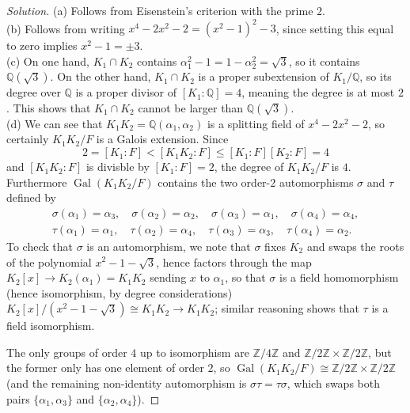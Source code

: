 \documentclass[10pt]{article}
\providecommand{\Gal}{\operatorname{Gal}}
\providecommand{\QQ}{\mathbb Q}
\providecommand{\ZZ}{\mathbb Z}
\newenvironment{soln}{\begin{proof}[Solution]}{\end{proof}}
\begin{document}
\begin{soln}
    (a) Follows from Eisenstein's criterion with the prime $2$.
    \\

    (b) Follows from writing
    $x^4 - 2x^2 - 2 = (x^2 - 1)^2 - 3$,
    since setting this equal to zero implies
    $x^2 - 1 = \pm 3$.
    \\

    (c) On one hand, $K_1\cap K_2$ contains
    $\alpha_1^2 - 1 = 1 - \alpha_2^2 = \sqrt 3$,
    so it contains $\QQ(\sqrt 3)$.
    On the other hand, $K_1\cap K_2$ is a proper subextension of $K_1/\QQ$,
    so its degree over $\QQ$ is a proper divisor of $[K_1 : \QQ] = 4$,
    meaning the degree is at most $2$. This shows that
    $K_1\cap K_2$ cannot be larger than $\QQ(\sqrt 3)$.
    \\

    (d) We can see that $K_1K_2 = \QQ(\alpha_1,\alpha_2)$
    is a splitting field of $x^4 - 2x^2 - 2$, so certainly
    $K_1K_2/F$ is a Galois extension. Since
    \[
	2 = [K_1 : F] < [K_1K_2 : F] \le [K_1 : F][K_2 : F] = 4
    \]
    and $[K_1K_2 : F]$ is divisble by $[K_1 : F] = 2$,
    the degree of $K_1K_2/F$ is $4$.
    Furthermore $\Gal(K_1K_2/F)$ contains the two order-$2$ automorphisms
    $\sigma$ and $\tau$ defined by
    \begin{gather*}
        \sigma(\alpha_1) = \alpha_3,\quad
	\sigma(\alpha_2) = \alpha_2,\quad
	\sigma(\alpha_3) = \alpha_1,\quad
	\sigma(\alpha_4) = \alpha_4,\\
        \tau(\alpha_1) = \alpha_1,\quad
	\tau(\alpha_2) = \alpha_4,\quad
	\tau(\alpha_3) = \alpha_3,\quad
	\tau(\alpha_4) = \alpha_2.
    \end{gather*}
    To check that $\sigma$ is an automorphism, we note that
    $\sigma$ fixes $K_2$ and swaps the roots of the polynomial
    $x^2 - 1 - \sqrt 3$, hence factors through the map
    $K_2[x]\to K_2(\alpha_1) = K_1K_2$ sending $x$ to $\alpha_1$,
    so that $\sigma$ is a field homomorphism (hence isomorphism,
    by degree considerations)
    $K_2[x]/(x^2 - 1 - \sqrt3)\cong K_1K_2\to K_1K_2$;
    similar reasoning shows that $\tau$ is a field isomorphism.

    The only groups of order $4$ up to isomorphism
    are $\ZZ/4\ZZ$ and $\ZZ/2\ZZ\times\ZZ/2\ZZ$,
    but the former only has one element of order $2$,
    so $\Gal(K_1K_2/F)\cong\ZZ/2\ZZ\times\ZZ/2\ZZ$
    (and the remaining non-identity automorphism is $\sigma\tau=\tau\sigma$,
    which swaps both pairs $\{\alpha_1,\alpha_3\}$
    and $\{\alpha_2,\alpha_4\}$).


\end{soln}
\end{document}
